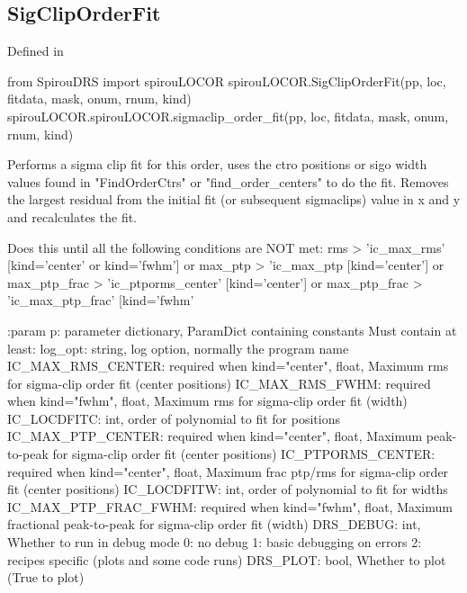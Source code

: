 \begin{minipage}{\textwidth}
\subsection{SigClipOrderFit}

Defined in \spirouLOCOR{}

\begin{pythonbox}
from SpirouDRS import spirouLOCOR
spirouLOCOR.SigClipOrderFit(pp, loc, fitdata, mask, onum, rnum, kind)
spirouLOCOR.spirouLOCOR.sigmaclip_order_fit(pp, loc, fitdata, mask, onum, rnum, kind)
\end{pythonbox}

\begin{pythondocstring}
Performs a sigma clip fit for this order, uses the ctro positions or
sigo width values found in "FindOrderCtrs" or "find_order_centers" to do
the fit. Removes the largest residual from the initial fit (or subsequent
sigmaclips) value in x and y and recalculates the fit.

Does this until all the following conditions are NOT met:
       rms > 'ic_max_rms'   [kind='center' or kind='fwhm']
    or max_ptp > 'ic_max_ptp [kind='center']
    or max_ptp_frac > 'ic_ptporms_center'   [kind='center']
    or max_ptp_frac > 'ic_max_ptp_frac'     [kind='fwhm'

:param p: parameter dictionary, ParamDict containing constants
    Must contain at least:
            log_opt: string, log option, normally the program name
            IC_MAX_RMS_CENTER: required when kind="center", float, Maximum
                               rms for sigma-clip order fit (center
                               positions)
            IC_MAX_RMS_FWHM: required when kind="fwhm", float, Maximum
                             rms for sigma-clip order fit (width)
            IC_LOCDFITC: int, order of polynomial to fit for positions
            IC_MAX_PTP_CENTER: required when kind="center", float, Maximum
                               peak-to-peak for sigma-clip order fit
                               (center positions)
            IC_PTPORMS_CENTER: required when kind="center", float, Maximum
                               frac ptp/rms for sigma-clip order fit
                               (center positions)
            IC_LOCDFITW: int, order of polynomial to fit for widths
            IC_MAX_PTP_FRAC_FWHM: required when kind="fwhm", float, Maximum
                                  fractional peak-to-peak for sigma-clip
                                  order fit (width)
            DRS_DEBUG: int, Whether to run in debug mode
                            0: no debug
                            1: basic debugging on errors
                            2: recipes specific (plots and some code runs)
            DRS_PLOT: bool, Whether to plot (True to plot)


\end{pythondocstring}
\end{minipage}
